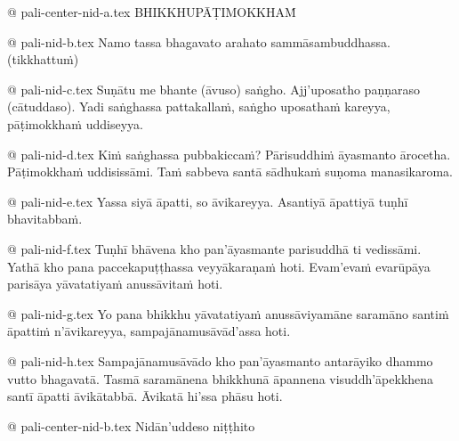 @ pali-center-nid-a.tex
﻿BHIKKHUPĀṬIMOKKHAṀ

@ pali-nid-b.tex
Namo tassa bhagavato arahato sammāsambuddhassa.
(tikkhattuṁ)

@ pali-nid-c.tex
Suṇātu me bhante (āvuso) saṅgho. Ajj’uposatho paṇṇaraso (cātuddaso). Yadi saṅghassa pattakallaṁ, saṅgho uposathaṁ kareyya, pāṭimokkhaṁ uddiseyya.

@ pali-nid-d.tex
Kiṁ saṅghassa pubbakiccaṁ? Pārisuddhiṁ āyasmanto ārocetha. Pāṭimokkhaṁ uddisissāmi. Taṁ sabbeva santā sādhukaṁ suṇoma manasikaroma.

@ pali-nid-e.tex
Yassa siyā āpatti, so āvikareyya. Asantiyā āpattiyā tuṇhī bhavitabbaṁ. 

@ pali-nid-f.tex
Tuṇhī bhāvena kho pan’āyasmante parisuddhā ti vedissāmi. Yathā kho pana paccekapuṭṭhassa veyyākaraṇaṁ hoti. Evam’evaṁ evarūpāya parisāya yāvatatiyaṁ anussāvitaṁ hoti.

@ pali-nid-g.tex
Yo pana bhikkhu yāvatatiyaṁ anussāviyamāne saramāno santiṁ āpattiṁ n’āvikareyya, sampajānamusāvād’assa hoti.

@ pali-nid-h.tex
Sampajānamusāvādo kho pan’āyasmanto antarāyiko dhammo vutto bhagavatā. Tasmā saramānena bhikkhunā āpannena visuddh’āpekkhena santī āpatti āvikātabbā. Āvikatā hi’ssa phāsu hoti.

@ pali-center-nid-b.tex
Nidān’uddeso niṭṭhito
